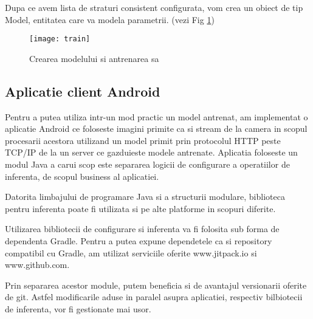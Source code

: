 	\newpage

	Dupa ce avem lista de straturi consistent configurata, vom crea un obiect de tip Model, entitatea care va modela parametrii. (vezi Fig \ref{fig:train})
	
	\begin{figure}[H]
		\texttt{[image: train]}
		\caption{\label{fig:train} Crearea modelului si antrenarea sa}
	\end{figure}
	
	\subsection{Aplicatie client Android}
	
	Pentru a putea utiliza intr-un mod practic un model antrenat, am implementat o aplicatie Android ce foloseste imagini primite ca si stream de la camera in scopul procesarii acestora utilizand un model primit prin protocolul HTTP peste TCP/IP de la un server ce gazduieste modele antrenate. 
	Aplicatia foloseste un modul Java a carui scop este separarea logicii de configurare a operatiilor de inferenta, de scopul business al aplicatiei. \newline
	
	Datorita limbajului de programare Java si a structurii modulare, biblioteca pentru inferenta poate fi utilizata si pe alte platforme in scopuri diferite.
	
	Utilizarea bibliotecii de configurare si inferenta va fi folosita sub forma de dependenta Gradle. Pentru a putea expune dependetele ca si repository compatibil cu Gradle, am utilizat serviciile oferite www.jitpack.io si www.github.com. 
	
	Prin separarea acestor module, putem beneficia si de avantajul versionarii oferite de git. Astfel modificarile aduse in paralel asupra aplicatiei, respectiv bilbiotecii de inferenta, vor fi gestionate mai usor.
	
	
	
	
	
